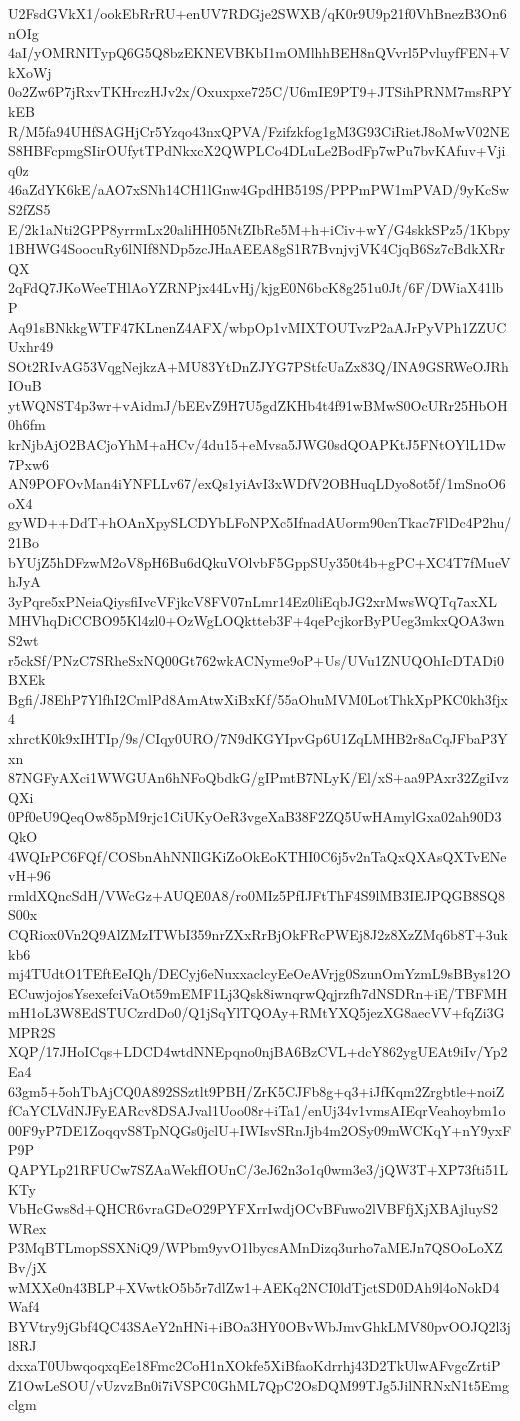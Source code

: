 U2FsdGVkX1/ookEbRrRU+enUV7RDGje2SWXB/qK0r9U9p21f0VhBnezB3On6nOIg
4aI/yOMRNITypQ6G5Q8bzEKNEVBKbI1mOMlhhBEH8nQVvrl5PvluyfFEN+VkXoWj
0o2Zw6P7jRxvTKHrczHJv2x/Oxuxpxe725C/U6mIE9PT9+JTSihPRNM7msRPYkEB
R/M5fa94UHfSAGHjCr5Yzqo43nxQPVA/Fzifzkfog1gM3G93CiRietJ8oMwV02NE
S8HBFcpmgSIirOUfytTPdNkxcX2QWPLCo4DLuLe2BodFp7wPu7bvKAfuv+Vjiq0z
46aZdYK6kE/aAO7xSNh14CH1lGnw4GpdHB519S/PPPmPW1mPVAD/9yKcSwS2fZS5
E/2k1aNti2GPP8yrrmLx20aliHH05NtZIbRe5M+h+iCiv+wY/G4skkSPz5/1Kbpy
1BHWG4SoocuRy6lNIf8NDp5zcJHaAEEA8gS1R7BvnjvjVK4CjqB6Sz7cBdkXRrQX
2qFdQ7JKoWeeTHlAoYZRNPjx44LvHj/kjgE0N6bcK8g251u0Jt/6F/DWiaX41lbP
Aq91sBNkkgWTF47KLnenZ4AFX/wbpOp1vMIXTOUTvzP2aAJrPyVPh1ZZUCUxhr49
SOt2RIvAG53VqgNejkzA+MU83YtDnZJYG7PStfcUaZx83Q/INA9GSRWeOJRhIOuB
ytWQNST4p3wr+vAidmJ/bEEvZ9H7U5gdZKHb4t4f91wBMwS0OcURr25HbOH0h6fm
krNjbAjO2BACjoYhM+aHCv/4du15+eMvsa5JWG0sdQOAPKtJ5FNtOYlL1Dw7Pxw6
AN9POFOvMan4iYNFLLv67/exQs1yiAvI3xWDfV2OBHuqLDyo8ot5f/1mSnoO6oX4
gyWD++DdT+hOAnXpySLCDYbLFoNPXc5IfnadAUorm90cnTkac7FlDc4P2hu/21Bo
bYUjZ5hDFzwM2oV8pH6Bu6dQkuVOlvbF5GppSUy350t4b+gPC+XC4T7fMueVhJyA
3yPqre5xPNeiaQiysfiIvcVFjkcV8FV07nLmr14Ez0liEqbJG2xrMwsWQTq7axXL
MHVhqDiCCBO95Kl4zl0+OzWgLOQktteb3F+4qePcjkorByPUeg3mkxQOA3wnS2wt
r5ckSf/PNzC7SRheSxNQ00Gt762wkACNyme9oP+Us/UVu1ZNUQOhIcDTADi0BXEk
Bgfi/J8EhP7YlfhI2CmlPd8AmAtwXiBxKf/55aOhuMVM0LotThkXpPKC0kh3fjx4
xhrctK0k9xIHTIp/9s/CIqy0URO/7N9dKGYIpvGp6U1ZqLMHB2r8aCqJFbaP3Yxn
87NGFyAXci1WWGUAn6hNFoQbdkG/gIPmtB7NLyK/El/xS+aa9PAxr32ZgiIvzQXi
0Pf0eU9QeqOw85pM9rjc1CiUKyOeR3vgeXaB38F2ZQ5UwHAmylGxa02ah90D3QkO
4WQIrPC6FQf/COSbnAhNNIlGKiZoOkEoKTHI0C6j5v2nTaQxQXAsQXTvENevH+96
rmldXQncSdH/VWcGz+AUQE0A8/ro0MIz5PfIJFtThF4S9lMB3IEJPQGB8SQ8S00x
CQRiox0Vn2Q9AlZMzITWbI359nrZXxRrBjOkFRcPWEj8J2z8XzZMq6b8T+3ukkb6
mj4TUdtO1TEftEeIQh/DECyj6eNuxxaclcyEeOeAVrjg0SzunOmYzmL9sBBys12O
ECuwjojosYsexefciVaOt59mEMF1Lj3Qsk8iwnqrwQqjrzfh7dNSDRn+iE/TBFMH
mH1oL3W8EdSTUCzrdDo0/Q1jSqYlTQOAy+RMtYXQ5jezXG8aecVV+fqZi3GMPR2S
XQP/17JHoICqs+LDCD4wtdNNEpqno0njBA6BzCVL+dcY862ygUEAt9iIv/Yp2Ea4
63gm5+5ohTbAjCQ0A892SSztlt9PBH/ZrK5CJFb8g+q3+iJfKqm2Zrgbtle+noiZ
fCaYCLVdNJFyEARcv8DSAJval1Uoo08r+iTa1/enUj34v1vmsAIEqrVeahoybm1o
00F9yP7DE1ZoqqvS8TpNQGs0jclU+IWIsvSRnJjb4m2OSy09mWCKqY+nY9yxFP9P
QAPYLp21RFUCw7SZAaWekfIOUnC/3eJ62n3o1q0wm3e3/jQW3T+XP73fti51LKTy
VbHcGws8d+QHCR6vraGDeO29PYFXrrIwdjOCvBFuwo2lVBFfjXjXBAjluyS2WRex
P3MqBTLmopSSXNiQ9/WPbm9yvO1lbycsAMnDizq3urho7aMEJn7QSOoLoXZBv/jX
wMXXe0n43BLP+XVwtkO5b5r7dlZw1+AEKq2NCI0ldTjctSD0DAh9l4oNokD4Waf4
BYVtry9jGbf4QC43SAeY2nHNi+iBOa3HY0OBvWbJmvGhkLMV80pvOOJQ2l3jl8RJ
dxxaT0UbwqoqxqEe18Fmc2CoH1nXOkfe5XiBfaoKdrrhj43D2TkUlwAFvgcZrtiP
Z1OwLeSOU/vUzvzBn0i7iVSPC0GhML7QpC2OsDQM99TJg5JilNRNxN1t5Emgclgm
